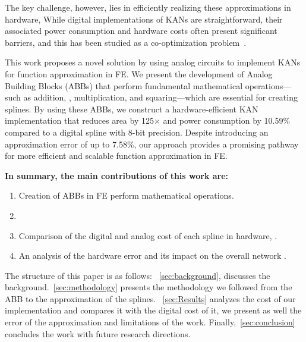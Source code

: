 The key challenge, however, lies in efficiently realizing these approximations in hardware,  While digital implementations of KANs are straightforward, their associated power consumption and hardware costs often present significant barriers, and this has been studied as a co-optimization problem~\cite{VanDuy:KANCodesign:2024,Huang:KANAcceletaror:2024}.

This work proposes a novel solution by using analog circuits to implement KANs for function approximation in FE.
We present the development of Analog Building Blocks (ABBs) that perform fundamental mathematical operations—such as addition, , multiplication, and squaring—which are essential for creating splines.
By using these ABBs, we construct a hardware-efficient KAN implementation that reduces area by 125$\times$ and power consumption by 10.59\% compared to a digital spline with 8-bit precision.
Despite introducing an approximation error of up to 7.58\%, our approach provides a promising pathway for more efficient and scalable function approximation in FE. 

\textbf{In summary, the main contributions of this work are:}

\begin{enumerate} 
    \item Creation of ABBs in FE  perform  mathematical operations.
    \item {}
    \item Comparison of the digital and analog cost of each spline in hardware, .
    \item An analysis of the hardware error and its impact on the overall network .
\end{enumerate}

The structure of this paper is as follows: ~\autoref{sec:background}, discusses the background.~\autoref{sec:methodology} presents the methodology we followed from the ABB to the approximation of the splines. ~\autoref{sec:Results} analyzes the cost of our implementation and compares it with the digital cost of it, we present as well the error of the approximation and limitations of the work.
Finally,~\autoref{sec:conclusion} concludes the work with future research directions.